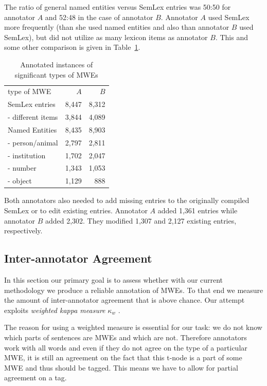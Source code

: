 The ratio of general named entities versus SemLex entries was 50:50 for annotator $A$ and 52:48 in the case of annotator $B$. Annotator $A$ used SemLex more frequently (than she used named entities and also than annotator $B$ used SemLex), but did not utilize as many lexicon items as annotator $B$.
This and some other comparison is given in Table~\ref{tab:anot}.

\begin{table}[h]
\begin{tabular}{l|r|r}
type of MWE&$A$&$B$\\
\cline{1-3}
SemLex entries&8,447&8,312\\
 - different items&3,844&4,089\\
Named Entities&8,435&8,903\\
 - person/animal&2,797&2,811\\
 - institution&1,702&2,047\\
 - number&1,343&1,053\\
 - object&1,129&888\\
\end{tabular}
\caption{Annotated instances \newline of significant types of MWEs}
\label{tab:anot}
\end{table}

Both annotators also needed to add missing entries to the originally compiled SemLex or to edit existing entries. Annotator $A$ added 1,361 entries while annotator $B$ added 2,302. They modified 1,307 and 2,127 existing entries, respectively.


\subsection{Inter-annotator Agreement}
\label{agreement}

In this section our primary goal is to assess whether with our current methodology we produce a reliable annotation of MWEs. To that end we measure the amount of inter-annotator agreement that is above chance. Our attempt exploits {\it weighted kappa measure} $\kappa_w$ \cite{cohen:1968}.

The reason for using a weighted measure is essential for our task: we do not know which parts of sentences are MWEs and which are not. Therefore annotators work with all words and even if they do not agree on the type of a particular MWE, it is still an agreement on the fact that this t-node is a part of some MWE and thus should be tagged. This means we have to allow for partial agreement on a tag.

